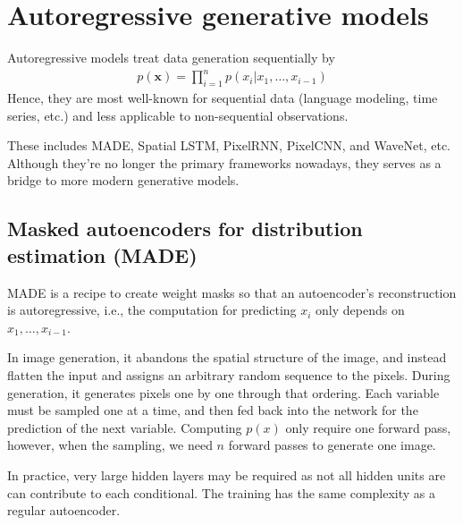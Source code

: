 \documentclass{mytufte-light}
\begin{document}
\clearpage
\section{Autoregressive generative models}
Autoregressive models treat data generation sequentially by
\begin{align}
    p(\mathbf{x}) = \prod_{i=1}^n p(x_i | x_1, \ldots, x_{i-1})
\end{align}
Hence,
they are most well-known for sequential data (language modeling, time series, etc.) 
and less applicable to non-sequential observations.

These includes MADE, Spatial LSTM, PixelRNN, PixelCNN, and WaveNet, etc.
Although they're no longer the primary frameworks nowadays, they
serves as a bridge to more modern generative models.


\subsection{Masked autoencoders for distribution estimation (MADE)}
MADE is a recipe to create weight masks so that an autoencoder's 
reconstruction is autoregressive, i.e., 
the computation for predicting \( x_i \) only depends on \( x_1, \ldots, x_{i-1} \).

In image generation, it abandons the spatial structure of the image,
and instead flatten the input and assigns an arbitrary random sequence to the pixels.
During generation, it generates pixels one by one through that ordering.
Each variable must be sampled one at a time, and then fed back into the network
for the prediction of the next variable.
Computing \( p(x) \) only require one forward pass, however, when the sampling, we need
\( n\) forward passes to generate one image.

In practice, very large hidden layers may be required as not all 
hidden units are can contribute to each conditional.
The training has the same complexity as a regular autoencoder.
\end{document}
